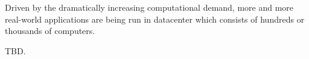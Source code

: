 
{}

Driven by the dramatically increasing computational demand, more and more 
real-world applications are being run in datacenter which consists of hundreds 
or thousands of computers.

{}

TBD.
